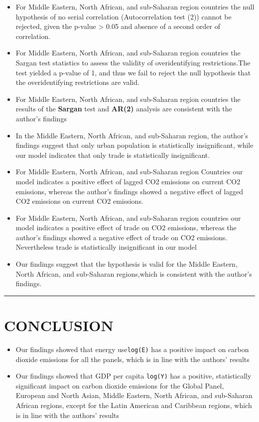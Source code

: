 \documentclass[
  11pt,
]{article}
\begin{document}
\begin{itemize}
\item
  For Middle Eastern, North African, and sub-Saharan region countries
  the null hypothesis of no serial correlation (Autocorrelation test
  (2)) cannot be rejected, given the p-value \textgreater{} 0.05 and
  absence of a second order of correlation.
\item
  For Middle Eastern, North African, and sub-Saharan region countries
  the Sargan test statistics to assess the validity of overidentifying
  restrictions.The test yielded a p-value of 1, and thus we fail to
  reject the null hypothesis that the overidentifying restrictions are
  valid.
\item
  For Middle Eastern, North African, and sub-Saharan region countries
  the results of the \textbf{Sargan} test and \textbf{AR(2)} analysis
  are consistent with the author's findings
\item
  In the Middle Eastern, North African, and sub-Saharan region, the
  author's findings suggest that only urban population is statistically
  insignificant, while our model indicates that only trade is
  statistically insignificant.
\item
  For Middle Eastern, North African, and sub-Saharan region Countries
  our model indicates a positive effect of lagged CO2 emissions on
  current CO2 emissions, whereas the author's findings showed a negative
  effect of lagged CO2 emissions on current CO2 emissions.
\item
  For Middle Eastern, North African, and sub-Saharan region countries
  our model indicates a positive effect of trade on CO2 emissions,
  whereas the author's findings showed a negative effect of trade on CO2
  emissions. Nevertheless trade is statistically insignificant in our
  model
\item
  Our findings suggest that the hypothesis is valid for the Middle
  Eastern, North African, and sub-Saharan regions,which is consistent
  with the author's findings.
\end{itemize}

\begin{center}\rule{0.5\linewidth}{0.5pt}\end{center}

\hypertarget{conclusion}{%
\section{CONCLUSION}\label{conclusion}}

\begin{itemize}
\item
  Our findings showed that energy use\texttt{log(E)} has a positive
  impact on carbon dioxide emissions for all the panels, which is in
  line with the authors' results
\item
  Our findings showed that GDP per capita \texttt{log(Y)} has a
  positive, statistically significant impact on carbon dioxide emissions
  for the Global Panel, European and North Asian, Middle Eastern, North
  African, and sub-Saharan African regions, except for the Latin
  American and Caribbean regions, which is in line with the authors'
  results
\end{itemize}
\end{document}

